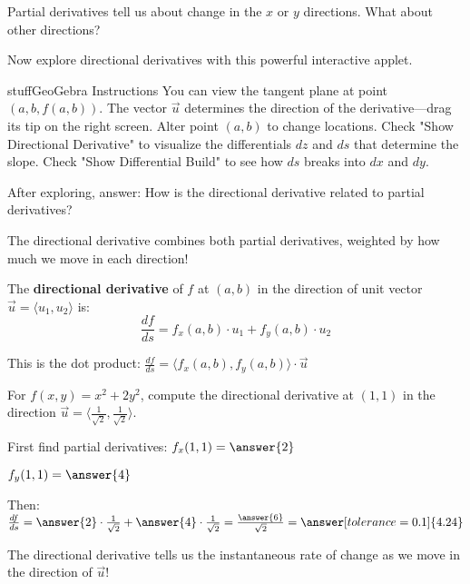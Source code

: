 \documentclass{ximera}
\begin{document}
Partial derivatives tell us about change in the $x$ or $y$ directions. What about other directions?

\begin{problem}
Now explore directional derivatives with this powerful interactive applet.

\begin{expandable}{stuff}{GeoGebra Instructions}
    You can view the tangent plane at point $(a,b,f(a,b))$. The vector $\vec u$ determines the direction of the derivative—drag its tip on the right screen. Alter point $(a,b)$ to change locations. Check "Show Directional Derivative" to visualize the differentials $dz$ and $ds$ that determine the slope. Check "Show Differential Build" to see how $ds$ breaks into $dx$ and $dy$.
\end{expandable}

\begin{center}
\end{center}

After exploring, answer: How is the directional derivative related to partial derivatives?

\begin{multipleChoice}
\end{multipleChoice}

\begin{feedback}
The directional derivative combines both partial derivatives, weighted by how much we move in each direction!
\end{feedback}
\end{problem}

\begin{definition}
The \textbf{directional derivative} of $f$ at $(a, b)$ in the direction of unit vector $\vec{u} = \langle u_1, u_2 \rangle$ is:
$$\frac{df}{ds} = f_x(a,b) \cdot u_1 + f_y(a,b) \cdot u_2$$

This is the dot product: $\frac{df}{ds} = \langle f_x(a,b), f_y(a,b) \rangle \cdot \vec{u}$
\end{definition}

\begin{problem}
For $f(x, y) = x^2 + 2y^2$, compute the directional derivative at $(1, 1)$ in the direction $\vec{u} = \langle \frac{1}{\sqrt{2}}, \frac{1}{\sqrt{2}} \rangle$.

First find partial derivatives:
$f_x(1, 1) = \answer{2}$

$f_y(1, 1) = \answer{4}$

Then: $\frac{df}{ds} = \answer{2} \cdot \frac{1}{\sqrt{2}} + \answer{4} \cdot \frac{1}{\sqrt{2}} = \frac{\answer{6}}{\sqrt{2}} = \answer[tolerance=0.1]{4.24}$

\begin{feedback}
The directional derivative tells us the instantaneous rate of change as we move in the direction of $\vec{u}$!
\end{feedback}
\end{problem}
\end{document}
